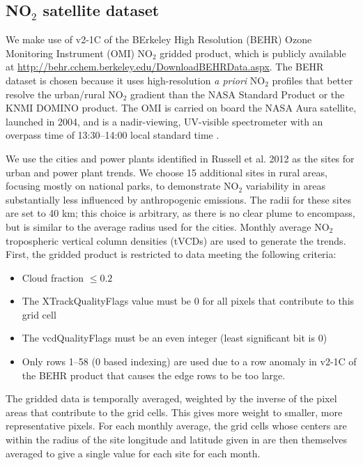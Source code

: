 \documentclass[a4paper,10pt,oneside]{article}
\newcommand{\ce}[1]{$\mathrm{#1}$}
\begin{document}
\begin{sloppy}
\subsection{NO$_2$ satellite dataset}
	We make use of v2-1C of the BErkeley High Resolution (BEHR) Ozone Monitoring Instrument (OMI) \ce{NO_2} gridded product, which is publicly available at \url{http://behr.cchem.berkeley.edu/DownloadBEHRData.aspx}. The BEHR dataset is chosen because it uses high-resolution \emph{a priori} \ce{NO_2} profiles that better resolve the urban/rural \ce{NO_2} gradient than the NASA Standard Product or the KNMI DOMINO product. The OMI is carried on board the NASA Aura satellite, launched in 2004, and is a nadir-viewing, UV-visible spectrometer with an overpass time of 13:30--14:00 local standard time \cite{levelt06}.
	
	We use the cities and power plants identified in Russell et al. 2012 \cite{russell12} as the sites for urban and power plant trends. We choose 15 additional sites in rural areas, focusing mostly on national parks, to demonstrate \ce{NO_2} variability in areas substantially less influenced by anthropogenic emissions. The radii for these sites are set to 40 km; this choice is arbitrary, as there is no clear plume to encompass, but is similar to the average radius used for the cities. Monthly average \ce{NO_2} tropospheric vertical column densities (tVCDs) are used to generate the trends. First, the gridded product is restricted to data meeting the following criteria:
	
	\begin{itemize}
	\item Cloud fraction $\leq 0.2$
	\item The XTrackQualityFlags value must be 0 for all pixels that contribute to this grid cell
	\item The vcdQualityFlags must be an even integer (least significant bit is 0)
	\item Only rows 1--58 (0 based indexing) are used due to a 
    row anomaly 
    in v2-1C of the BEHR product that causes the edge rows to be too large.
	\end{itemize}
	
	The gridded data is temporally averaged, weighted by the inverse of the pixel areas that contribute to the grid cells. This gives more weight to smaller, more representative pixels.  For each monthly average, the grid cells whose centers are within the radius of the site longitude and latitude given in \cite{russell12} are then themselves averaged to give a single value for each site for each month.


\end{sloppy}
\end{document}
